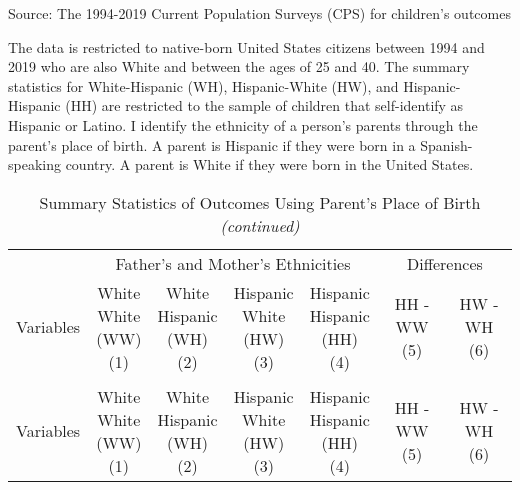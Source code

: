 
\begin{landscape}
\begin{ThreePartTable}
\begin{TableNotes}
\item[1] Source: The 1994-2019 Current Population Surveys (CPS) for children's outcomes
\item[2] The data is restricted to native-born United States citizens between 1994 and 2019 who are also White and between the ages of 25 and 40. The summary statistics for White-Hispanic (WH), Hispanic-White (HW), and Hispanic-Hispanic (HH) are restricted to the sample of children that self-identify as Hispanic or Latino. I identify the ethnicity of a person's parents through the parent's place of birth. A parent is Hispanic if they were born in a Spanish-speaking country. A parent is White if they were born in the United States.
\end{TableNotes}
\begin{longtable}[t]{>{\raggedright\arraybackslash}p{5cm}cccccc}
\caption{Summary Statistics of Outcomes Using Parent's Place of Birth\label{tab:c&p2}}\\
\toprule
\multicolumn{1}{c}{ } & \multicolumn{4}{c}{Father's and Mother's Ethnicities} & \multicolumn{2}{c}{Differences} \\
\cmidrule(l{3pt}r{3pt}){2-5} \cmidrule(l{3pt}r{3pt}){6-7}
Variables & \specialcell{White \\ White \\ (WW) \\ (1)} & \specialcell{White \\ Hispanic \\ (WH) \\ (2)} & \specialcell{Hispanic \\ White \\ (HW) \\ (3)} & \specialcell{Hispanic \\ Hispanic \\ (HH) \\ (4)} & \specialcell{HH - WW \\ (5)} & \specialcell{HW - WH \\ (6)}\\
\midrule
\endfirsthead
\caption[]{Summary Statistics of Outcomes Using Parent's Place of Birth  \textit{(continued)}}\\
\toprule
Variables & \specialcell{White \\ White \\ (WW) \\ (1)} & \specialcell{White \\ Hispanic \\ (WH) \\ (2)} & \specialcell{Hispanic \\ White \\ (HW) \\ (3)} & \specialcell{Hispanic \\ Hispanic \\ (HH) \\ (4)} & \specialcell{HH - WW \\ (5)} & \specialcell{HW - WH \\ (6)}\\

\end{longtable}
\end{ThreePartTable}
\end{landscape}
